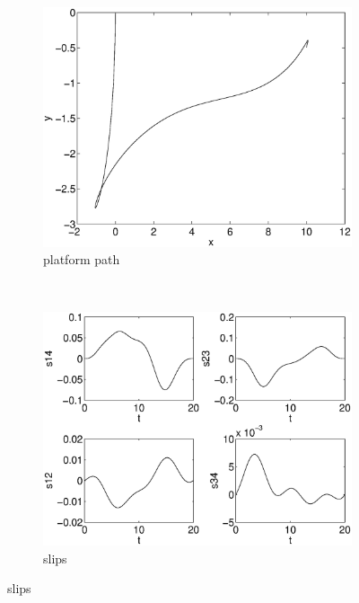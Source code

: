 \begin{figure}[h]
\begin{subfigure}[b]{0.45\textwidth}
\centering
\includegraphics[width=\textwidth]{img/manip_pltf_task_path.eps}
\caption{platform path}
\end{subfigure}
~
\begin{subfigure}[b]{0.45\textwidth}
\centering
\includegraphics[width=\textwidth]{img/manip_pltf_task_slips.eps}
\caption{slips}
\end{subfigure}


\end{figure}
